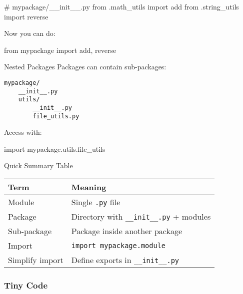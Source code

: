 \documentclass[
  letterpaper,
  DIV=11,
  numbers=noendperiod]{scrreprt}
\newenvironment{Shaded}{\begin{snugshade}}{\end{snugshade}}
\newcommand{\CommentTok}[1]{\textcolor[rgb]{0.37,0.37,0.37}{#1}}
\newcommand{\ImportTok}[1]{\textcolor[rgb]{0.00,0.46,0.62}{#1}}
\newcommand{\NormalTok}[1]{\textcolor[rgb]{0.00,0.23,0.31}{#1}}
\begin{document}
\begin{Shaded}
\begin{Highlighting}[]
\CommentTok{\# mypackage/\_\_init\_\_.py}
\ImportTok{from}\NormalTok{ .math\_utils }\ImportTok{import}\NormalTok{ add}
\ImportTok{from}\NormalTok{ .string\_utils }\ImportTok{import}\NormalTok{ reverse}
\end{Highlighting}
\end{Shaded}

Now you can do:

\begin{Shaded}
\begin{Highlighting}[]
\ImportTok{from}\NormalTok{ mypackage }\ImportTok{import}\NormalTok{ add, reverse}
\end{Highlighting}
\end{Shaded}

Nested Packages Packages can contain sub-packages:

\begin{verbatim}
mypackage/
    __init__.py
    utils/
        __init__.py
        file_utils.py
\end{verbatim}

Access with:

\begin{Shaded}
\begin{Highlighting}[]
\ImportTok{import}\NormalTok{ mypackage.utils.file\_utils}
\end{Highlighting}
\end{Shaded}

Quick Summary Table

\begin{longtable}[]{@{}ll@{}}
\toprule\noalign{}
Term & Meaning \\
\midrule\noalign{}
\endhead
\bottomrule\noalign{}
\endlastfoot
Module & Single \texttt{.py} file \\
Package & Directory with \texttt{\_\_init\_\_.py} + modules \\
Sub-package & Package inside another package \\
Import & \texttt{import\ mypackage.module} \\
Simplify import & Define exports in \texttt{\_\_init\_\_.py} \\
\end{longtable}

\subsubsection{Tiny Code}\label{tiny-code-46}
\end{document}
